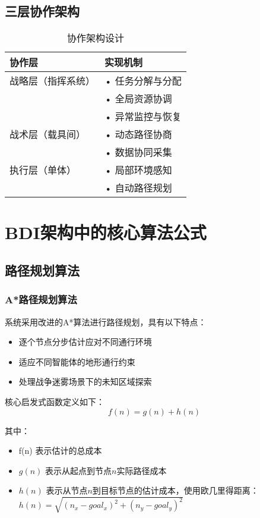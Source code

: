 \documentclass[12pt,a4paper]{article}
\begin{document}
\subsection{三层协作架构}

\begin{table}[h]
\centering
\caption{协作架构设计}
\begin{tabular}{|>{\centering\arraybackslash}p{4cm}|>{\raggedright\arraybackslash}p{9cm}|}
\hline
\textbf{协作层} & \textbf{实现机制} \\
\hline
\rowcolor{lightgray}
战略层（指挥系统） & • 任务分解与分配\\
& • 全局资源协调\\
& • 异常监控与恢复\\
\hline
战术层（载具间） & • 动态路径协商\\
& • 数据协同采集\\
\hline
\rowcolor{lightgray}
执行层（单体） & • 局部环境感知\\
& • 自动路径规划\\
\hline
\end{tabular}
\end{table}




\section{BDI架构中的核心算法公式}

\subsection{路径规划算法}

\subsubsection{A*路径规划算法}
系统采用改进的A*算法进行路径规划，具有以下特点：

\begin{itemize}
\item 逐个节点分步估计应对不同通行环境
\item 适应不同智能体的地形通行约束 
\item 处理战争迷雾场景下的未知区域探索
\end{itemize}

核心启发式函数定义如下：
\begin{equation}
f(n) = g(n) + h(n)
\end{equation}

其中：
\begin{itemize}
\item f(n) 表示估计的总成本
\item $g(n)$ 表示从起点到节点$n$实际路径成本
\item $h(n)$ 表示从节点$n$到目标节点的估计成本，使用欧几里得距离：\\$h(n) = \sqrt{(n_x - goal_x)^2 + (n_y - goal_y)^2}$
\end{itemize}
\end{document}
